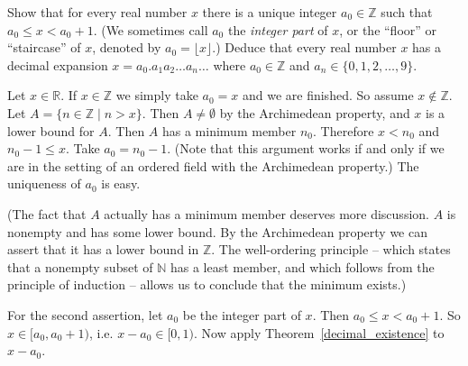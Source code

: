 \documentclass[11pt,dvipsnames]{book}
\numberwithin{figure}{section} %
\numberwithin{table}{section} %
\begin{document}
\begin{exercise}
Show that for every real number $x$ there is a unique integer $a_0 \in \mathbb{Z}$ such that $a_0 \leq x < a_0 +1$. (We sometimes call $a_0$ the {\em integer part} of $x$, or the ``floor'' or ``staircase'' of $x$, denoted by $a_0 = \lfloor x \rfloor$.) Deduce that every real number $x$ has a decimal expansion
$x = a_0.a_1 a_2 \dots a_n \dots$
where $a_0 \in \mathbb{Z}$ and $a_n \in \{0,1,2, \dots, 9\}$.
\begin{solution}
Let $x \in \mathbb{R}$. If $x \in \mathbb{Z}$ we simply take $a_0 = x$ and we are finished. So assume $x \notin \mathbb{Z}$. Let $A= \{ n \in \mathbb{Z} \; | \; n > x\}$. Then $A \neq \emptyset$ by the Archimedean property, and $x$ is a lower bound for $A$. Then $A$ has a minimum member $n_0$. Therefore $x < n_0$ and $ n_0 - 1 \leq x$. Take $a_0 = n_0 -1$. (Note that this argument works if and only if we are in the setting of an ordered field with the Archimedean property.)
The uniqueness of $a_0$ is easy.

(The fact that $A$ actually has a minimum member deserves more discussion. $A$ is nonempty and has some lower bound. By the Archimedean property we can assert that it has a lower bound in $\mathbb{Z}$. The well-ordering principle -- which states that a nonempty subset of $\mathbb{N}$ has a least member, and which follows from the principle of induction -- allows us to conclude that the minimum exists.)

\medskip
For the second assertion, let $a_{0}$ be the integer part of $x$. Then
$a_{0}\leq x<a_{0}+1$.
So $x\in [a_{0},a_{0}+1)$, i.e. $x - a_0 \in [0,1)$. Now apply Theorem~\ref{decimal_existence} to $x - a_0$.
\end{solution}
\end{exercise}
\end{document}
